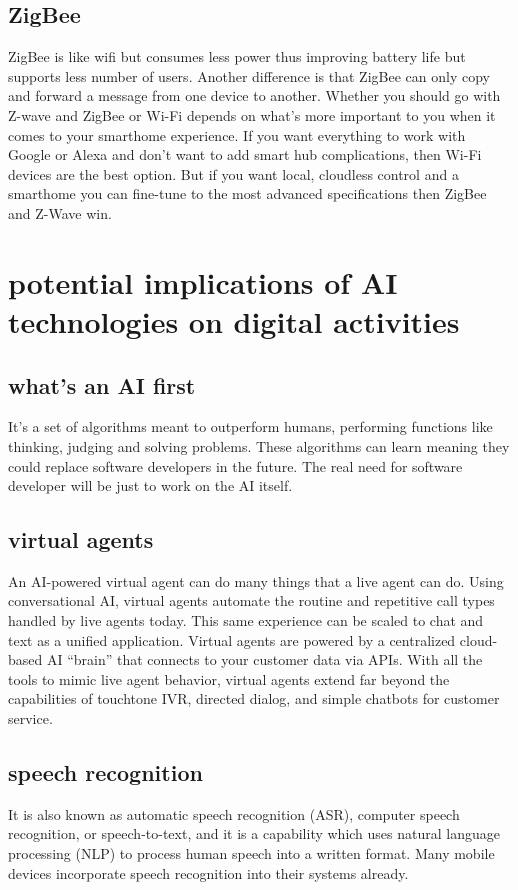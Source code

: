 \documentclass[a4paper,12pt]{book}
\begin{document}
\subsection{ZigBee}
ZigBee is like wifi but consumes less power thus improving battery life but supports less number of users.
Another difference is that ZigBee can only copy and forward a message from one device to another. 
Whether you should go with Z-wave and ZigBee or Wi-Fi depends on what’s more important to you when it comes to your smarthome experience. If you want everything to work with Google or Alexa and don’t want to add smart hub complications, then Wi-Fi devices are the best option. But if you want local, cloudless control and a smarthome you can fine-tune to the most advanced specifications then ZigBee and Z-Wave win.

\section{potential implications of AI technologies on digital activities}

\subsection{what's an AI first}
It's a set of algorithms meant to outperform humans, performing functions like thinking, judging and solving problems. These algorithms can learn meaning they could replace software developers in the future. The real need for software developer will be just to work on the AI itself.

\subsection{virtual agents}

An AI-powered virtual agent can do many things that a live agent can do. Using conversational AI, virtual agents automate the routine and repetitive call types handled by live agents today. This same experience can be scaled to chat and text as a unified application. Virtual agents are powered by a centralized cloud-based AI “brain” that connects to your customer data via APIs. With all the tools to mimic live agent behavior, virtual agents extend far beyond the capabilities of touchtone IVR, directed dialog, and simple chatbots for customer service.

\subsection{speech recognition}
It is also known as automatic speech recognition (ASR), computer speech recognition, or speech-to-text, and it is a capability which uses natural language processing (NLP) to process human speech into a written format. Many mobile devices incorporate speech recognition into their systems already.
 
\end{document}
